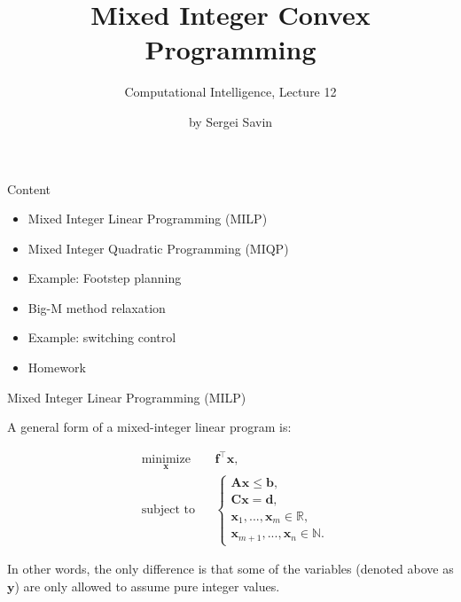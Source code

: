 \documentclass{beamer}
\title{Mixed Integer Convex Programming}
\subtitle{Computational Intelligence, Lecture 12}
\author{by Sergei Savin}
\date{\mydate}
\begin{document}
\maketitle


\begin{frame}{Content}

\begin{itemize}
\item Mixed Integer Linear Programming (MILP)
\item Mixed Integer Quadratic Programming (MIQP)
\item Example: Footstep planning
\item Big-M method relaxation
\item Example: switching control
\item Homework
\end{itemize}

\end{frame}



\begin{frame}{Mixed Integer Linear Programming (MILP)}
\begin{flushleft}

A general form of a mixed-integer linear program is:

%
\begin{equation} \label{LP}
\begin{aligned}
& \underset{\mathbf{x}}{\text{minimize}}
& & \mathbf{f}^\top \mathbf{x}, \\
& \text{subject to}
& & \begin{cases} 
\mathbf{A} \mathbf{x}
\leq 
\mathbf{b}, \\ 
\mathbf{C}\mathbf{x} = 
\mathbf{d},  \\
\mathbf{x}_1, ..., \mathbf{x}_m \in \mathbb{R},\\
\mathbf{x}_{m+1}, ..., \mathbf{x}_n \in \mathbb{N}.
\end{cases}
%
\end{aligned}
\end{equation}
 
In other words, the only difference is that some of the variables (denoted above as $\mathbf{y}$) are only allowed to assume pure integer values.
 
\end{flushleft}
\end{frame}
\end{document}
